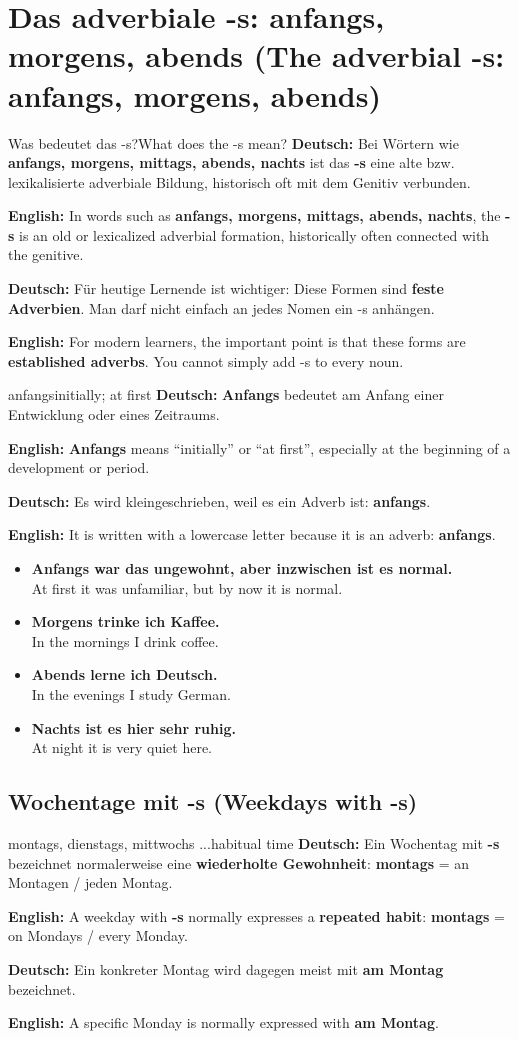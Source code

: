 \documentclass[a4paper,11pt]{article}
\newcommand{\GermanText}[1]{\textbf{Deutsch: }#1\par}
\newcommand{\EnglishText}[1]{{\small\color{SoftGray}\textbf{English: }#1\par}}
\newcommand{\ExampleItem}[2]{\item \textbf{#1}\\{\small\color{SoftGray}#2}}
\newcommand{\BSection}[2]{\section{#1 \textnormal{\small (#2)}}}
\newcommand{\BSubsection}[2]{\subsection{#1 \textnormal{\small (#2)}}}
\begin{document}
\BSection{Das adverbiale -s: anfangs, morgens, abends}{The adverbial -s: anfangs, morgens, abends}

\begin{grammarentry}{Was bedeutet das -s?}{What does the -s mean?}
\GermanText{Bei Wörtern wie \textbf{anfangs, morgens, mittags, abends, nachts} ist das \textbf{-s} eine alte bzw. lexikalisierte adverbiale Bildung, historisch oft mit dem Genitiv verbunden.}
\EnglishText{In words such as \textbf{anfangs, morgens, mittags, abends, nachts}, the \textbf{-s} is an old or lexicalized adverbial formation, historically often connected with the genitive.}

\GermanText{Für heutige Lernende ist wichtiger: Diese Formen sind \textbf{feste Adverbien}. Man darf nicht einfach an jedes Nomen ein -s anhängen.}
\EnglishText{For modern learners, the important point is that these forms are \textbf{established adverbs}. You cannot simply add -s to every noun.}
\end{grammarentry}

\begin{grammarentry}{anfangs}{initially; at first}
\GermanText{\textbf{Anfangs} bedeutet \glqq am Anfang einer Entwicklung oder eines Zeitraums\grqq{}.}
\EnglishText{\textbf{Anfangs} means ``initially'' or ``at first'', especially at the beginning of a development or period.}
\GermanText{Es wird kleingeschrieben, weil es ein Adverb ist: \textbf{anfangs}.}
\EnglishText{It is written with a lowercase letter because it is an adverb: \textbf{anfangs}.}
\end{grammarentry}

\begin{exbox}
\begin{itemize}
\ExampleItem{Anfangs war das ungewohnt, aber inzwischen ist es normal.}{At first it was unfamiliar, but by now it is normal.}
\ExampleItem{Morgens trinke ich Kaffee.}{In the mornings I drink coffee.}
\ExampleItem{Abends lerne ich Deutsch.}{In the evenings I study German.}
\ExampleItem{Nachts ist es hier sehr ruhig.}{At night it is very quiet here.}
\end{itemize}
\end{exbox}

\BSubsection{Wochentage mit -s}{Weekdays with -s}

\begin{grammarentry}{montags, dienstags, mittwochs ...}{habitual time}
\GermanText{Ein Wochentag mit \textbf{-s} bezeichnet normalerweise eine \textbf{wiederholte Gewohnheit}: \textbf{montags} = an Montagen / jeden Montag.}
\EnglishText{A weekday with \textbf{-s} normally expresses a \textbf{repeated habit}: \textbf{montags} = on Mondays / every Monday.}

\GermanText{Ein konkreter Montag wird dagegen meist mit \textbf{am Montag} bezeichnet.}
\EnglishText{A specific Monday is normally expressed with \textbf{am Montag}.}
\end{grammarentry}
\end{document}
